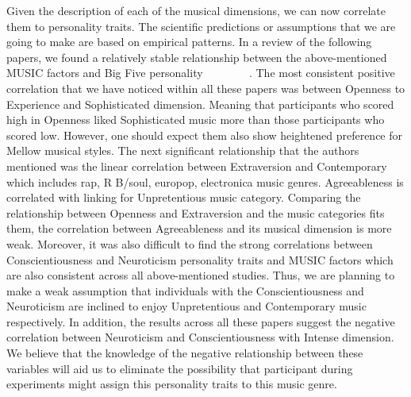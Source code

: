 \par Given the description of each of the musical dimensions, we can now correlate them to personality traits. The scientific predictions or assumptions that we are going to make are based on empirical patterns. In a review of the following papers, we found a relatively stable relationship between the above-mentioned MUSIC factors and Big Five personality ~\cite{schafer2017can} ~\cite{bonneville2013music} ~\cite{fricke2017personality} ~\cite{greenberg2016song} ~\cite{langmeyer2012music}. The most consistent positive correlation that we have noticed within all these papers was between Openness to Experience and Sophisticated dimension. Meaning that participants who scored high in Openness liked Sophisticated music more than those participants who scored low. However, one should expect them also show heightened preference for Mellow musical styles. The next significant relationship that the authors mentioned was the linear correlation between Extraversion and Contemporary which includes rap, R B/soul, europop, electronica music genres. Agreeableness is correlated with linking for Unpretentious music category. Comparing the relationship between Openness and Extraversion and the music categories fits them, the correlation between Agreeableness and its musical dimension is more weak. Moreover, it was also difficult to find the strong correlations between Conscientiousness and Neuroticism personality traits and MUSIC factors which are also consistent across all above-mentioned studies. Thus, we are planning to make a weak assumption that individuals with the Conscientiousness and Neuroticism are inclined to enjoy Unpretentious and Contemporary music respectively. In addition, the results across all these papers suggest the negative correlation between Neuroticism and Conscientiousness with Intense dimension. We believe that the knowledge of the negative relationship between these variables will aid us to eliminate the possibility that participant during experiments might assign this personality traits to this music genre. 

